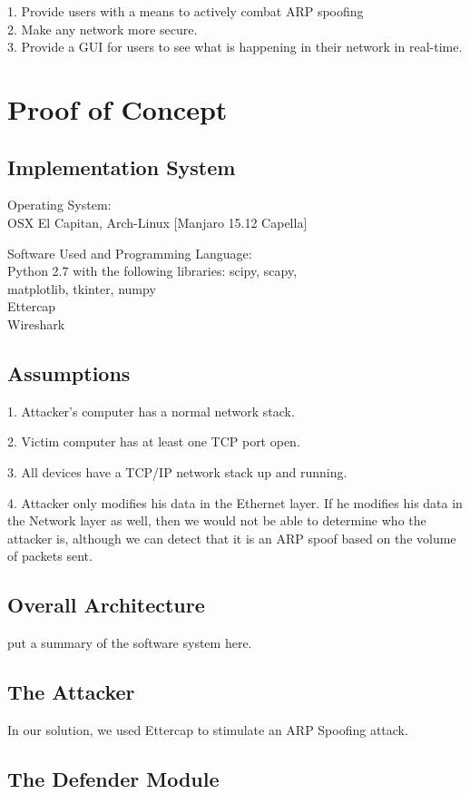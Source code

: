 \documentclass{acm_proc_article-sp}
\begin{document}
1. Provide users with a means to actively combat ARP spoofing \\
2. Make any network more secure. \\
3. Provide a GUI for users to see what is happening in their network in real-time. 

\section{Proof of Concept}
\subsection{Implementation System}
Operating System: \\
OSX El Capitan, Arch-Linux [Manjaro 15.12 Capella]

Software Used and Programming Language: \\
Python 2.7 with the following libraries: scipy, scapy, \\matplotlib, tkinter, numpy \\ Ettercap \\ Wireshark

\subsection{Assumptions}
1. Attacker's computer has a normal network stack. 

2. Victim computer has at least one TCP port open.

3. All devices have a TCP/IP network stack up and running.

4. Attacker only modifies his data in the Ethernet layer. If he modifies his data in the Network layer as well, then we would not be able to determine who the attacker is, although we can detect that it is an ARP spoof based on the volume of packets sent. 

\subsection{Overall Architecture}
put a summary of the software system here.

\subsection{The Attacker}
In our solution, we used Ettercap to stimulate an ARP Spoofing attack. 

\subsection{The Defender Module}
\end{document}
